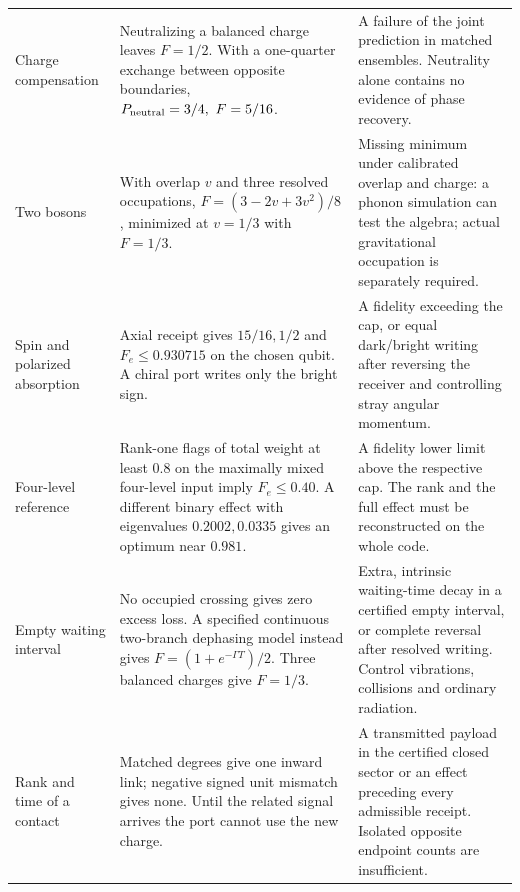 \begin{longtable}{@{}L{.215\linewidth}L{.36\linewidth}L{.36\linewidth}@{}}
Charge compensation & Neutralizing a balanced charge leaves \(F=1/2\). With a one-quarter exchange between opposite boundaries, \(P_{\rm neutral}=3/4,\ F=5/16\). & A failure of the joint prediction in matched ensembles. Neutrality alone contains no evidence of phase recovery.\\[3pt]
Two bosons & With overlap \(v\) and three resolved occupations, \(F=(3-2v+3v^2)/8\), minimized at \(v=1/3\) with \(F=1/3\). & Missing minimum under calibrated overlap and charge: a phonon simulation can test the algebra; actual gravitational occupation is separately required.\\[3pt]
Spin and polarized absorption & Axial receipt gives \(15/16,1/2\) and \(F_e\le0.930715\) on the chosen qubit. A chiral port writes only the bright sign. & A fidelity exceeding the cap, or equal dark/bright writing after reversing the receiver and controlling stray angular momentum.\\[3pt]
Four-level reference & Rank-one flags of total weight at least \(0.8\) on the maximally mixed four-level input imply \(F_e\le0.40\). A different binary effect with eigenvalues \(0.2002,0.0335\) gives an optimum near \(0.981\). & A fidelity lower limit above the respective cap. The rank and the full effect must be reconstructed on the whole code.\\[3pt]
Empty waiting interval & No occupied crossing gives zero excess loss. A specified continuous two-branch dephasing model instead gives \(F=(1+e^{-\Gamma T})/2\). Three balanced charges give \(F=1/3\). & Extra, intrinsic waiting-time decay in a certified empty interval, or complete reversal after resolved writing. Control vibrations, collisions and ordinary radiation.\\[3pt]
Rank and time of a contact & Matched degrees give one inward link; negative signed unit mismatch gives none. Until the related signal arrives the port cannot use the new charge. & A transmitted payload in the certified closed sector or an effect preceding every admissible receipt. Isolated opposite endpoint counts are insufficient.\\
\bottomrule\end{longtable}
\normalsize

